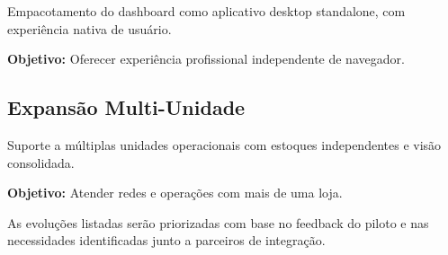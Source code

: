 Empacotamento do dashboard como aplicativo desktop standalone,
com experiência nativa de usuário.

\textbf{Objetivo:} Oferecer experiência profissional independente
de navegador.

\subsection{Expansão Multi-Unidade}

Suporte a múltiplas unidades operacionais com estoques independentes
e visão consolidada.

\textbf{Objetivo:} Atender redes e operações com mais de uma loja.

\vspace{1em}

\begin{infobox}
As evoluções listadas serão priorizadas com base no feedback do piloto
e nas necessidades identificadas junto a parceiros de integração.
\end{infobox}
